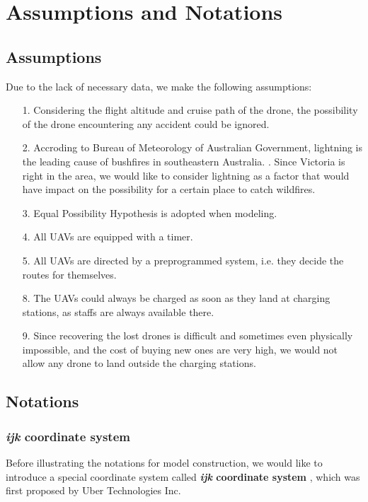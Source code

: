 \documentclass[13pt]{ctexart} %
\begin{document}
\section{Assumptions and Notations}
\subsection{Assumptions}
Due to the lack of necessary data, we make the following assumptions:

\begin{itemize}[itemsep=0.3ex, leftmargin=1.2cm]
    \item[1.] Considering the flight altitude and cruise path of the drone, the possibility of the drone encountering any accident could be ignored.
    \item[2.] Accroding to Bureau of Meteorology of Australian Government, lightning is the leading cause of bushfires in southeastern Australia. \cite{au-gov-weather}. Since Victoria is right in the area, we would like to consider lightning as a factor that would have impact on the possibility for a certain place to catch wildfires.
    \item[3.] Equal Possibility Hypothesis is adopted when modeling.
    \item[4.] All UAVs are equipped with a timer.
    \item[5.] All UAVs are directed by a preprogrammed system, i.e. they decide the routes for themselves.
    \item[8.] The UAVs could always be charged as soon as they land at charging stations, as staffs are always available there.
    \item[9.]\label{ampt09} Since recovering the lost drones is difficult and sometimes even physically impossible, and the cost of buying new ones are very high, we would not allow any drone to land outside the charging stations.

\end{itemize}
\subsection{Notations}
\subsubsection{\textit{ijk} coordinate system}
Before illustrating the notations for model construction, we would like to introduce a special coordinate system called \textbf{\textit{ijk} coordinate system} \cite{uber-h3-doc}, which was first proposed by Uber Technologies Inc.
\end{document}
